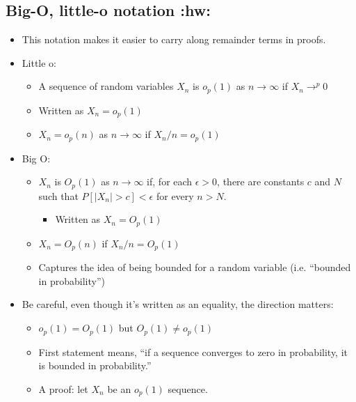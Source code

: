 \subsection{Big-O, little-o notation \textbf{:hw:}}
\begin{itemize}
\item This notation makes it easier to carry along remainder terms in
  proofs.
\item Little o:
\begin{itemize}
\item A sequence of random variables $X_n$ is $o_p(1)$ as $n \to
         \infty$ if $X_n \to^p 0$
\item Written as $X_n = o_p(1)$
\item $X_n = o_p(n)$ as $n \to \infty$ if $X_n/n = o_p(1)$
\end{itemize}
\item Big O:
\begin{itemize}
\item $X_n$ is $O_p(1)$ as $n \to \infty$ if, for each $\epsilon >
         0$, there are constants $c$ and $N$ such that $P[|X_n| > c] < \epsilon$ for every $n > N$.
\begin{itemize}
\item Written as $X_n = O_p(1)$
\end{itemize}
\item $X_n = O_p(n)$ if $X_n/n = O_p(1)$
\item Captures the idea of being bounded for a random variable
         (i.e. ``bounded in probability'')
\end{itemize}
\item Be careful, even though it's written as an equality, the direction matters:
\begin{itemize}
\item $o_p(1) = O_p(1)$ but $O_p(1) \neq o_p(1)$
\item First statement means, ``if a sequence converges to zero in
         probability, it is bounded in probability.''
\item A proof: let $X_n$ be an $o_p(1)$ sequence.
\begin{itemize}

\end{itemize}
\end{itemize}
\end{itemize}
